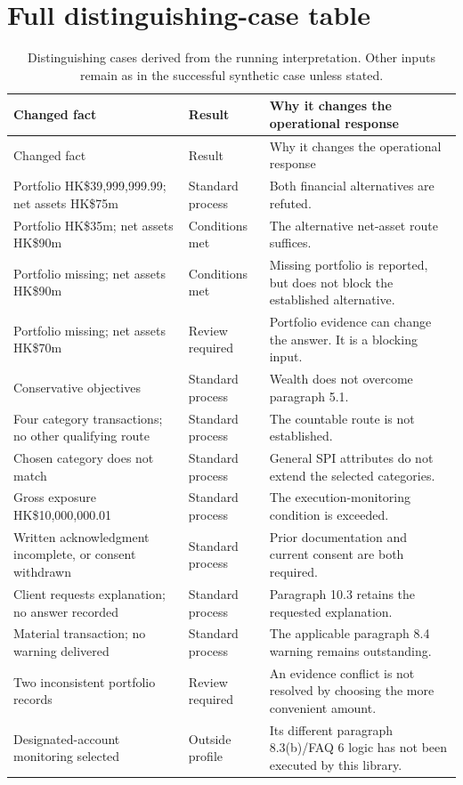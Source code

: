 \section{Full distinguishing-case table}
\begingroup\small
\begin{longtable}{P{0.38\textwidth}P{0.19\textwidth}P{0.33\textwidth}}
\caption{Distinguishing cases derived from the running interpretation. Other
inputs remain as in the successful synthetic case unless stated.}\label{tab:dry-cases}\\
\toprule Changed fact & Result & Why it changes the operational response \\\midrule
\endfirsthead
\toprule Changed fact & Result & Why it changes the operational response \\\midrule
\endhead
Portfolio HK\$39,999,999.99; net assets HK\$75m & Standard process & Both financial alternatives are refuted.\\
Portfolio HK\$35m; net assets HK\$90m & Conditions met & The alternative net-asset route suffices.\\
Portfolio missing; net assets HK\$90m & Conditions met & Missing portfolio is reported, but does not block the established alternative.\\
Portfolio missing; net assets HK\$70m & Review required & Portfolio evidence can change the answer. It is a blocking input.\\
Conservative objectives & Standard process & Wealth does not overcome paragraph 5.1.\\
Four category transactions; no other qualifying route & Standard process & The countable route is not established.\\
Chosen category does not match & Standard process & General SPI attributes do not extend the selected categories.\\
Gross exposure HK\$10,000,000.01 & Standard process & The execution-monitoring condition is exceeded.\\
Written acknowledgment incomplete, or consent withdrawn & Standard process & Prior documentation and current consent are both required.\\
Client requests explanation; no answer recorded & Standard process & Paragraph 10.3 retains the requested explanation.\\
Material transaction; no warning delivered & Standard process & The applicable paragraph 8.4 warning remains outstanding.\\
Two inconsistent portfolio records & Review required & An evidence conflict is not resolved by choosing the more convenient amount.\\
Designated-account monitoring selected & Outside profile & Its different paragraph 8.3(b)/FAQ 6 logic has not been executed by this library.\\
\bottomrule
\end{longtable}
\endgroup
